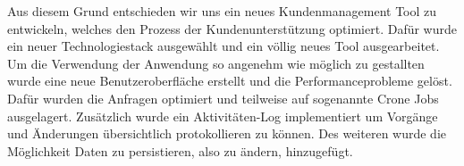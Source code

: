 Aus diesem Grund entschieden wir uns ein neues Kundenmanagement Tool zu entwickeln, welches den Prozess der Kundenunterstützung optimiert. Dafür wurde ein neuer Technologiestack ausgewählt und ein völlig neues Tool ausgearbeitet. Um die Verwendung der Anwendung so angenehm wie möglich zu gestallten wurde eine neue Benutzeroberfläche erstellt und die Performanceprobleme gelöst. Dafür wurden die Anfragen optimiert und teilweise auf sogenannte Crone Jobs ausgelagert.
\newline
Zusätzlich wurde ein Aktivitäten-Log implementiert um Vorgänge und Änderungen übersichtlich protokollieren zu können. Des weiteren wurde die Möglichkeit Daten zu persistieren, also zu ändern, hinzugefügt.